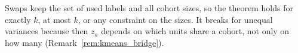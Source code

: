 \begin{remark}
  Swaps keep the set of used labels and all cohort sizes, so the theorem
  holds for exactly $k$, at most $k$, or any constraint on the sizes. It
  breaks for unequal variances because then $z_a$ depends on which units
  share a cohort, not only on how many (Remark~\ref{rem:kmeans_bridge}).
\end{remark}
